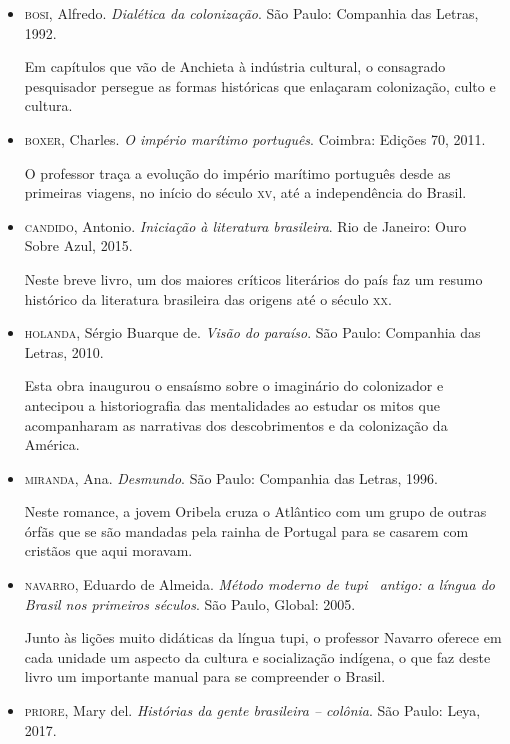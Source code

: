 \documentclass[12pt]{extarticle}
\begin{document}
\begin{itemize}
\item\textsc{bosi}, Alfredo. \textit{Dialética da colonização}. São Paulo: Companhia
das Letras, 1992.

Em capítulos que vão de Anchieta à indústria cultural, o consagrado
pesquisador persegue as formas históricas que enlaçaram colonização,
culto e cultura.

\item\textsc{boxer}, Charles. \textit{O império marítimo português}. Coimbra: Edições 70, 2011.

O professor traça a evolução do império marítimo português desde as
primeiras viagens, no início do século \textsc{xv}, até a independência do
Brasil.

\item\textsc{candido}, Antonio. \textit{Iniciação à literatura brasileira}. Rio de
Janeiro: Ouro Sobre Azul, 2015.

Neste breve livro, um dos maiores críticos literários do país faz um
resumo histórico da literatura brasileira das origens até o século \textsc{xx}.

\item\textsc{holanda}, Sérgio Buarque de. \textit{Visão do paraíso}. São Paulo:
Companhia das Letras, 2010.

Esta obra inaugurou o ensaísmo sobre o imaginário do colonizador e
antecipou a historiografia das mentalidades ao estudar os mitos que
acompanharam as narrativas dos descobrimentos e da colonização da
América.

\item\textsc{miranda}, Ana. \textit{Desmundo}. São Paulo: Companhia das Letras, 1996.

Neste romance, a jovem Oribela cruza o Atlântico com um grupo de outras
órfãs que se são mandadas pela rainha de Portugal para se casarem com
cristãos que aqui moravam.

\item\textsc{navarro}, Eduardo de Almeida. \textit{Método moderno de tupi~
antigo: a língua do Brasil nos primeiros séculos}. São Paulo, Global: 2005.

Junto às lições muito didáticas da língua tupi, o professor Navarro 
oferece em cada unidade um aspecto da cultura e socialização indígena, 
o que faz deste livro um importante manual para se compreender o Brasil.

\item\textsc{priore}, Mary del. \textit{Histórias da gente brasileira -- colônia}. São Paulo: Leya, 2017.


\end{itemize}
\end{document}
